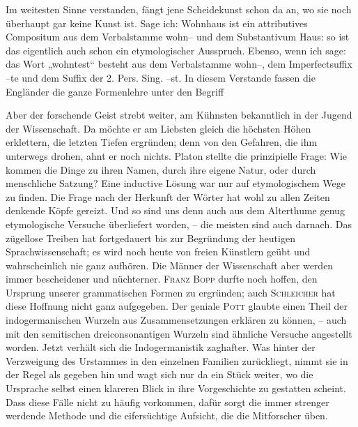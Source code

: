 {Im weitesten Sinne verstanden, fängt jene Scheidekunst schon da an, wo sie noch überhaupt gar keine Kunst ist. Sage ich: Wohnhaus ist ein attributives Compositum aus dem Verbalstamme wohn– und dem Substantivum Haus: so ist das eigentlich auch schon ein etymologischer Ausspruch. Ebenso, wenn ich sage: das Wort „wohntest“ besteht aus dem Verbalstamme wohn–, dem Imperfectsuffix –te und dem \label{fp.189} Suffix der 2. Pers. Sing. –st. In diesem Verstande fassen die Engländer die ganze Formenlehre unter den Begriff 

Aber der forschende Geist strebt weiter, am Kühnsten bekanntlich in der Jugend der Wissenschaft. Da möchte er am Liebsten gleich die höchsten Höhen erklettern, die letzten Tiefen ergründen; denn von den Gefahren, die ihm unterwegs drohen, ahnt er noch nichts. Platon stellte die prinzipielle Frage: Wie kommen die Dinge zu ihren Namen, durch ihre eigene Natur, oder durch menschliche Satzung? Eine inductive Lösung war nur auf etymologischem Wege zu finden. Die Frage nach der Herkunft der Wörter hat wohl zu allen Zeiten denkende Köpfe gereizt. Und so sind uns denn auch aus dem Alterthume genug etymologische Versuche überliefert worden, – die meisten sind auch darnach. Das zügellose Treiben hat fortgedauert bis zur Begründung der heutigen Sprachwissenschaft; es wird noch heute von freien Künstlern geübt und wahrscheinlich nie ganz aufhören. Die Männer der Wissenschaft aber werden immer bescheidener und nüchterner. \textsc{Franz Bopp }durfte noch hoffen, \label{sp.180} den Ursprung unserer grammatischen Formen zu ergründen; auch \textsc{Schleicher} hat diese Hoffnung nicht ganz aufgegeben. Der geniale \textsc{Pott} glaubte einen Theil der indogermanischen Wurzeln aus Zusammensetzungen erklären zu können, – auch mit den semitischen dreiconsonantigen Wurzeln sind ähnliche Versuche angestellt worden. Jetzt verhält sich die Indogermanistik zaghafter. Was hinter der Verzweigung des Urstammes in den einzelnen Familien zurückliegt, nimmt sie in der Regel als gegeben hin und wagt sich nur da ein Stück weiter, wo die Ursprache selbst einen klareren Blick in ihre Vorgeschichte zu gestatten scheint. Dass diese Fälle nicht zu häufig vorkommen, dafür sorgt die immer strenger werdende Methode und die eifersüchtige Aufsicht, die die Mitforscher üben.

}
